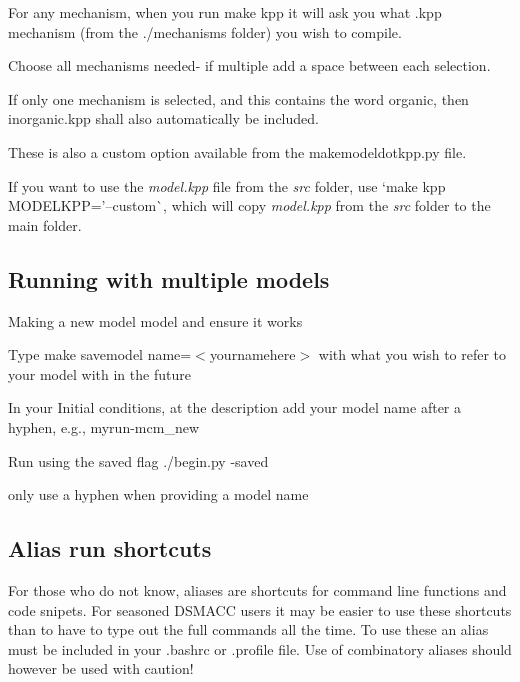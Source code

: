 
\begin{DoxyEnumerate}
\item For any mechanism, when you run {\ttfamily make kpp} it will ask you what .kpp mechanism (from the ./mechanisms folder) you wish to compile.
\item Choose all mechanisms needed-\/ if multiple add a space between each selection.
\item If only one mechanism is selected, and this contains the word \textquotesingle{}organic\textquotesingle{}, then inorganic.\+kpp shall also automatically be included.
\item These is also a custom option available from the makemodeldotkpp.\+py file.
\item If you want to use the {\itshape model.\+kpp} file from the {\itshape src} folder, use `make kpp M\+O\+D\+E\+L\+K\+PP='--custom\textquotesingle{}\`{}, which will copy {\itshape model.\+kpp} from the {\itshape src} folder to the main folder.
\end{DoxyEnumerate}

\subsection*{Running with multiple models}


\begin{DoxyEnumerate}
\item Making a new model model and ensure it works
\item Type {\ttfamily make savemodel name=$<$yournamehere$>$} with what you wish to refer to your model with in the future
\item In your Initial conditions, at the description add your model name after a hyphen, e.\+g., myrun-\/mcm\+\_\+new
\item Run using the saved flag {\ttfamily ./begin.py -\/saved}
\end{DoxyEnumerate}
\begin{DoxyItemize}
\item only use a hyphen when providing a model name
\end{DoxyItemize}

\subsection*{Alias run shortcuts}

For those who do not know, aliases are shortcuts for command line functions and code snipets. For seasoned D\+S\+M\+A\+CC users it may be easier to use these shortcuts than to have to type out the full commands all the time. To use these an alias must be included in your .bashrc or .profile file. Use of combinatory aliases should however be used with caution!

